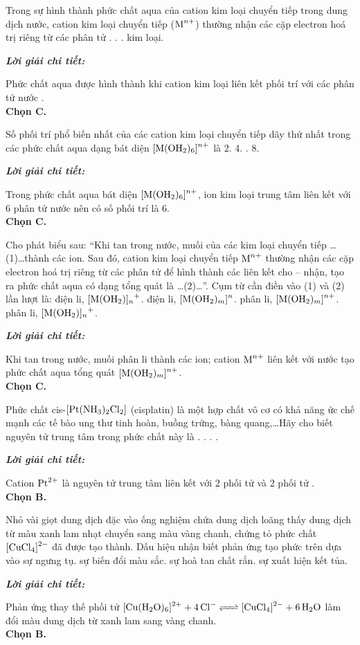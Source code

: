 \documentclass[11pt,a4paper]{article}
\def\loigiai#1{
\par\begingroup\color{blue!80!black}\small
\noindent\textbf{\textit{Lời giải chi tiết:}}\par
#1\par\endgroup}
\begin{document}
\begin{ex}
Trong sự hình thành phức chất aqua của cation kim loại chuyển tiếp trong dung dịch nước, cation kim loại chuyển tiếp ($\ce{M^{n+}}$) thường nhận các cặp electron hoá trị riêng từ các phân tử
\choice
{.}
{.}
{\True {}.}
{kim loại.}
\loigiai{
Phức chất aqua được hình thành khi cation kim loại liên kết phối trí với các phân tử nước \ce{H2O}.\\
\textbf{Chọn C.}}
\end{ex}

\begin{ex}
Số phối trí phổ biến nhất của các cation kim loại chuyển tiếp dãy thứ nhất trong các phức chất aqua dạng bát diện $\ce{[M(OH2)6]^{n+}}$ là
\choice
{2.}
{4.}
{.}
{8.}
\loigiai{
Trong phức chất aqua bát diện $\ce{[M(OH2)6]^{n+}}$, ion kim loại trung tâm liên kết với 6 phân tử nước nên có số phối trí là 6.\\
\textbf{Chọn C.}}
\end{ex}

\begin{ex}
Cho phát biểu sau: ``Khi tan trong nước, muối của các kim loại chuyển tiếp \dots(1)\dots thành các ion. Sau đó, cation kim loại chuyển tiếp $\ce{M^{n+}}$ thường nhận các cặp electron hoá trị riêng từ các phân tử  để hình thành các liên kết cho -- nhận, tạo ra phức chất aqua có dạng tổng quát là \dots(2)\dots''. Cụm từ cần điền vào (1) và (2) lần lượt là:
\choice
{điện li, $\ce{[M(OH2)]_n+}$.}
{điện li, $\ce{[M(OH2)_m]^n}$.}
{\True phân li, $\ce{[M(OH2)_m]^{n+}}$.}
{phân li, $\ce{[M(OH2)]_n+}$.}
\loigiai{
Khi tan trong nước, muối phân li thành các ion; cation $\ce{M^{n+}}$ liên kết với nước tạo phức chất aqua tổng quát $\ce{[M(OH2)_m]^{n+}}$.\\
\textbf{Chọn C.}}
\end{ex}

\begin{ex}
Phức chất cis-$\ce{[Pt(NH3)2Cl2]}$ (cisplatin) là một hợp chất vô cơ có khả năng ức chế mạnh các tế bào ung thư tinh hoàn, buồng trứng, bàng quang,\dots Hãy cho biết nguyên tử trung tâm trong phức chất này là
\choice
{.}
{\True {}.}
{.}
{.}
\loigiai{
Cation $\ce{Pt^2+}$ là nguyên tử trung tâm liên kết với 2 phối tử \ce{NH3} và 2 phối tử \ce{Cl-}.\\
\textbf{Chọn B.}}
\end{ex}

\begin{ex}
Nhỏ vài giọt dung dịch  đặc vào ống nghiệm chứa dung dịch  loãng thấy dung dịch từ màu xanh lam nhạt chuyển sang màu vàng chanh, chứng tỏ phức chất $\ce{[CuCl4]^2-}$ đã được tạo thành. Dấu hiệu nhận biết phản ứng tạo phức trên dựa vào
\choice
{sự ngưng tụ.}
{\True sự biến đổi màu sắc.}
{sự hoà tan chất rắn.}
{sự xuất hiện kết tủa.}
\loigiai{
Phản ứng thay thế phối tử $\ce{[Cu(H2O)6]^2+ + 4Cl- <=> [CuCl4]^2- + 6H2O}$ làm đổi màu dung dịch từ xanh lam sang vàng chanh.\\
\textbf{Chọn B.}}
\end{ex}
\end{document}
